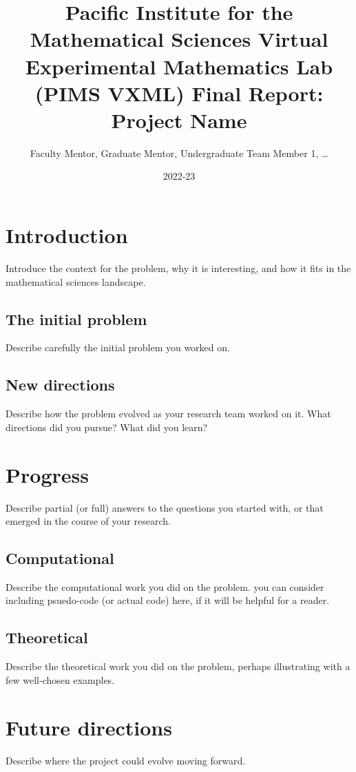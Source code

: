 \documentclass[12pt]{amsart}
\title[PIMS VXML Final Report]{Pacific Institute for the Mathematical Sciences Virtual Experimental Mathematics Lab (PIMS VXML) Final Report: \\ Project Name}
\author[FM, GM, UTM1]{Faculty Mentor, Graduate Mentor, Undergraduate Team Member 1, \ldots}
\date{2022-23}
\begin{document}
\maketitle
\thispagestyle{fancy}

\section{Introduction}

Introduce the context for the problem, why it is interesting, and how it fits in the mathematical sciences landscape.

\subsection{The initial problem} Describe carefully the initial problem you worked on.

\subsection{New directions} Describe how the problem evolved as your research team worked on it. What directions did you pursue? What did you learn? 


\newpage
\section{Progress}

Describe partial (or full) answers to the questions you started with, or that emerged in the course of your research.

\subsection{Computational} Describe the computational work you did on the problem. you can consider including psuedo-code (or actual code) here, if it will be helpful for a reader.

\subsection{Theoretical} Describe the theoretical work you did on the problem, perhaps illustrating with a few well-chosen examples.

\newpage
\section{Future directions}

Describe where the project could evolve moving forward.

\newpage
\begin{thebibliography}{99}

\end{thebibliography}
\end{document}

